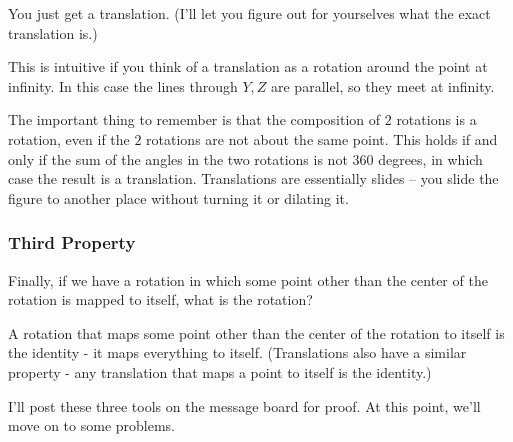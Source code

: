 


You just get a translation.  (I'll let you figure out for yourselves what the exact translation is.)


This is intuitive if you think of a translation as a rotation around the point at infinity. In this case the lines through $Y, Z$ are parallel, so they meet at infinity.

The important thing to remember is that the composition of $2$ rotations is a rotation, even if the $2$ rotations are not about the same point.  This holds if and only if the sum of the angles in the two rotations is not $360$ degrees, in which case the result is a translation.  Translations are essentially slides -- you slide the figure to another place without turning it or dilating it.

\subsubsection{Third Property}
Finally, if we have a rotation in which some point other than the center of the rotation is mapped to itself, what is the rotation?




A rotation that maps some point other than the center of the rotation to itself is the identity - it maps everything to itself.  (Translations also have a similar property - any translation that maps a point to itself is the identity.)

I'll post these three tools on the message board for proof.  At this point, we'll move on to some problems.

